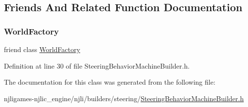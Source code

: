 \subsection{Friends And Related Function Documentation}
\mbox{\label{classnjli_1_1_steering_behavior_machine_builder_acb96ebb09abe8f2a37a915a842babfac}} 
\subsubsection{\texorpdfstring{World\+Factory}{WorldFactory}}
{\footnotesize\ttfamily friend class \mbox{\hyperlink{classnjli_1_1_world_factory}{World\+Factory}}\hspace{0.3cm}{\ttfamily [friend]}}



Definition at line 30 of file Steering\+Behavior\+Machine\+Builder.\+h.



The documentation for this class was generated from the following file\+:\begin{DoxyCompactItemize}
\item 
njligames-\/njlic\+\_\+engine/njli/builders/steering/\mbox{\hyperlink{_steering_behavior_machine_builder_8h}{Steering\+Behavior\+Machine\+Builder.\+h}}\end{DoxyCompactItemize}
